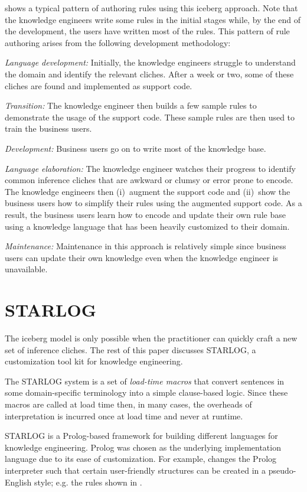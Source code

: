 \documentclass[twocolumn,global]{sys/svjour}
\begin{document}
 shows a typical pattern of authoring rules using this
iceberg approach. Note that the knowledge engineers write some rules
in the initial stages while, by the end of the development, the users
have written most of the rules. This pattern of rule authoring arises
from the following development methodology: \bd \item[{\em Language
development:}] Initially, the knowledge engineers struggle to
understand the domain and identify the relevant cliches.  After a
week or two, some of these cliches are found and implemented as
support code. \item[{\em Transition:}] The knowledge engineer then
builds a few sample rules to demonstrate the usage of the support
code. These sample rules are then used to train the business users.
\item[{\em Development:}] Business users go on to write most of the
knowledge base.\item[{\em Language elaboration:}] The knowledge
engineer watches their progress to identify common inference cliches
that are awkward or clumsy or error prone to encode. The knowledge
engineers then (i)~augment the support code and (ii)~show the
business users how to simplify their rules using the augmented
support code. As a result, the business users learn how to encode and
update their own rule base using a knowledge language that has been
heavily customized to their domain. \item[{\em Maintenance:}]
Maintenance in this approach is relatively  simple since
 business users can
update their own knowledge even when the knowledge engineer is
unavailable. \ed

\section{STARLOG}

The iceberg model is only possible when the practitioner can quickly
craft a new set of inference cliches. The rest of this paper
discusses STARLOG, a customization tool kit for knowledge
engineering.

The STARLOG system is a
 set of {\em load-time macros} that convert sentences
in some domain-specific terminology into a simple clause-based logic.
Since these macros are called at load time  then, in many cases, the
overheads of interpretation is incurred once at load time and never
at runtime.


STARLOG is a Prolog-based framework for building different languages
for knowledge engineering. Prolog was chosen as the underlying
implementation language due to its ease of customization. For
example,  changes the Prolog interpreter such that
certain user-friendly structures can be created in a pseudo-English
style; e.g. the rules shown in .
\end{document}
